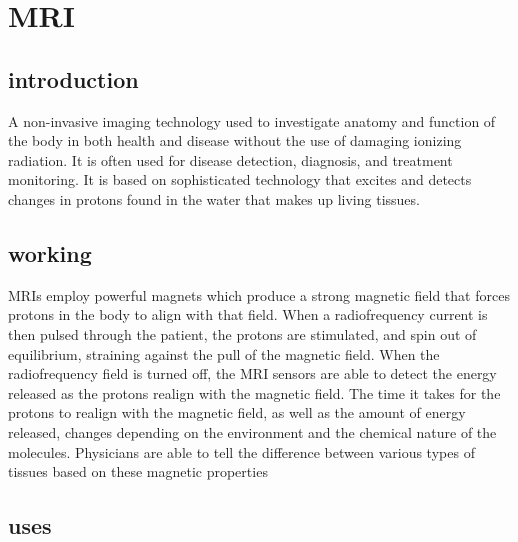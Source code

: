 \documentclass{article}
\begin{document}
\section{     MRI}













\subsection{introduction}




A non-invasive imaging technology used to investigate anatomy and function of the body in both health and disease without the use of damaging ionizing radiation. It is often used for disease detection, diagnosis, and treatment monitoring. It is based on sophisticated technology that excites and detects changes in protons found in the water that makes up living tissues. 















\subsection{working}

MRIs employ powerful magnets which produce a strong magnetic field that forces protons in the body to align with that field. When a radiofrequency current is then pulsed through the patient, the protons are stimulated, and spin out of equilibrium, straining against the pull of the magnetic field. When the radiofrequency field is turned off, the MRI sensors are able to detect the energy released as the protons realign with the magnetic field. The time it takes for the protons to realign with the magnetic field, as well as the amount of energy released, changes depending on the environment and the chemical nature of the molecules. Physicians are able to tell the difference between various types of tissues based on these magnetic properties

\subsection{uses}
\end{document}
